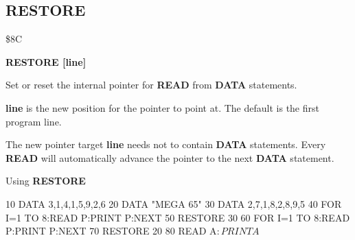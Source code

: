 
\newpage
\subsection{RESTORE}
\begin{description}[leftmargin=3cm,style=nextline]
\item [Token:] \$8C
\item [Format:] {\bf RESTORE [line]}
\item [Usage:]  Set or reset the internal pointer for
                {\bf READ} from {\bf DATA} statements.

                {\bf line} is the new position for the
                pointer to point at. The default is the
                first program line.

\item [Remarks:] The new pointer target {\bf line}
                 needs not to contain {\bf DATA} statements.
                 Every {\bf READ} will automatically advance
                 the pointer to the next {\bf DATA} statement.
\item [Example:] Using {\bf RESTORE}

\begin{screenoutput}
 10 DATA 3,1,4,1,5,9,2,6
 20 DATA "MEGA 65"
 30 DATA 2,7,1,8,2,8,9,5
 40 FOR I=1 TO 8:READ P:PRINT P:NEXT
 50 RESTORE 30
 60 FOR I=1 TO 8:READ P:PRINT P:NEXT
 70 RESTORE 20
 80 READ A$:PRINT A$
\end{screenoutput}
\end{description}


\newpage
